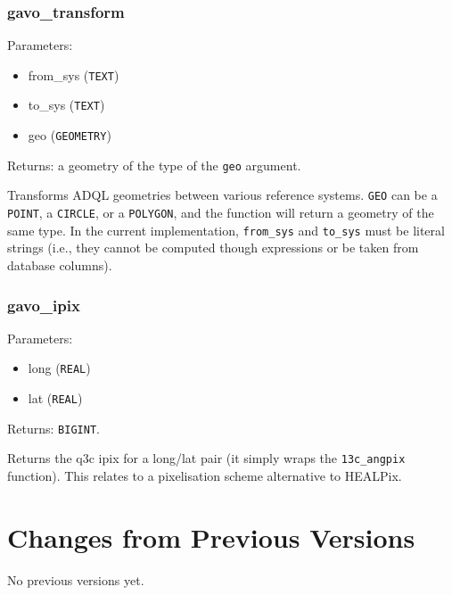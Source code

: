 \documentclass[11pt,a4paper]{ivoa}
\begin{document}
\subsubsection{gavo\_transform}

Parameters:

\begin{itemize}
	\item from\_sys (\texttt{TEXT})
	\item to\_sys (\texttt{TEXT})
	\item geo (\texttt{GEOMETRY})
\end{itemize}

Returns: a geometry of the type of the \texttt{geo} argument.

Transforms ADQL geometries between various reference systems.
\texttt{GEO} can be a \texttt{POINT}, a \texttt{CIRCLE}, or a
\texttt{POLYGON}, and the function will return a geometry of the same
type. In the current implementation, \texttt{from\_sys} and
\texttt{to\_sys} must be literal strings (i.e., they cannot be computed
though expressions or be taken from database columns).

\subsubsection{gavo\_ipix}

Parameters:

\begin{itemize}
	\item long (\texttt{REAL})
	\item lat (\texttt{REAL})
\end{itemize}

Returns: \texttt{BIGINT}.

Returns the q3c ipix \citep{soft:q3c} for a long/lat pair (it simply
wraps the \texttt{13c\_angpix} function). This relates to a pixelisation
scheme alternative to HEALPix.


\section{Changes from Previous Versions}

No previous versions yet.  



\end{document}
